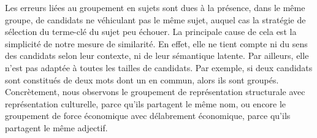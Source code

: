         Les erreurs liées au groupement en sujets sont dues à la présence, dans
        le même groupe, de candidats ne véhiculant pas le même sujet, auquel cas
        la stratégie de sélection du terme-clé du sujet peu échouer. La
        principale cause de cela est la simplicité de notre mesure de
        similarité. En effet, elle ne tient compte ni du sens des candidats
        selon leur contexte, ni de leur sémantique latente. Par ailleurs, elle
        n'est pas adaptée à toutes les tailles de candidats. Par exemple, si
        deux candidats sont constitués de deux mots dont un en commun, alors ils
        sont groupés. Concrètement, nous observons le groupement de
        \og{}représentation structurale\fg{} avec \og{}représentation
        culturelle\fg{}, parce qu'ils partagent le même nom, ou encore le
        groupement de \og{}force économique\fg{} avec \og{}délabrement
        économique\fg{}, parce qu'ils partagent le même adjectif.

